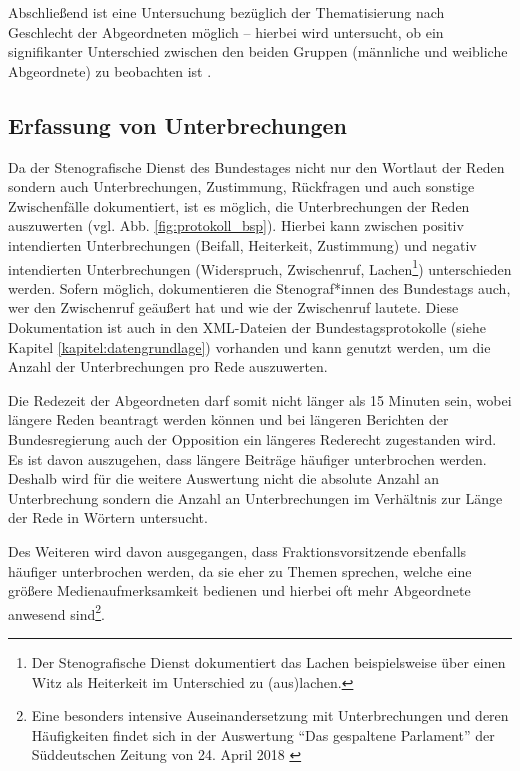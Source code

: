 \documentclass[12pt, 
    twoside=false, 
    bibliography=totoc, 
    numbers=endperiod, 
    headings=normal, 
    toc=chapterentrydotfill
    ]{scrbook}
\begin{document}
Abschließend ist eine Untersuchung bezüglich der Thematisierung nach Geschlecht der Abgeordneten möglich -- hierbei wird untersucht, ob ein signifikanter Unterschied zwischen den beiden Gruppen (männliche und weibliche Abgeordnete) zu beobachten ist \parencite[vgl.][3]{roberts_2013}. 


\subsection{Erfassung von Unterbrechungen}\label{kapitel:erfassung_unterbrechung}

Da der Stenografische Dienst des Bundestages nicht nur den Wortlaut der Reden sondern auch Unterbrechungen, Zustimmung, Rückfragen und auch sonstige Zwischenfälle dokumentiert, ist es möglich, die Unterbrechungen der Reden auszuwerten (vgl. Abb. \ref{fig:protokoll_bsp}). Hierbei kann zwischen positiv intendierten Unterbrechungen (Beifall, Heiterkeit, Zustimmung) und negativ intendierten Unterbrechungen (Widerspruch, Zwischenruf, Lachen\footnote{Der Stenografische Dienst dokumentiert das Lachen beispielsweise über einen Witz als Heiterkeit im Unterschied zu (aus)lachen.}) unterschieden werden.
Sofern möglich, dokumentieren die Stenograf*innen des Bundestags auch, wer den Zwischenruf geäußert hat und wie der Zwischenruf lautete. Diese Dokumentation ist auch in den XML-Dateien der Bundestagsprotokolle (siehe Kapitel \ref{kapitel:datengrundlage}) vorhanden und kann genutzt werden, um die Anzahl der Unterbrechungen pro Rede auszuwerten.

 Die Redezeit der Abgeordneten darf somit nicht länger als 15 Minuten sein, wobei längere Reden beantragt werden können und bei längeren Berichten der Bundesregierung auch der Opposition ein längeres Rederecht zugestanden wird. Es ist davon auszugehen, dass längere Beiträge häufiger unterbrochen werden. Deshalb wird für die weitere Auswertung nicht die absolute Anzahl an Unterbrechung sondern die Anzahl an Unterbrechungen im Verhältnis zur Länge der Rede in Wörtern untersucht.

Des Weiteren wird davon ausgegangen, dass Fraktionsvorsitzende ebenfalls häufiger unterbrochen werden, da sie eher zu Themen sprechen, welche eine größere Medienaufmerksamkeit bedienen und hierbei oft mehr Abgeordnete anwesend sind\footnote{Eine besonders intensive Auseinandersetzung mit Unterbrechungen und deren Häufigkeiten findet sich in der Auswertung \enquote{Das gespaltene Parlament} der Süddeutschen Zeitung von 24. April 2018 \parencite{sueddeutsche_2018}}.
\end{document}
